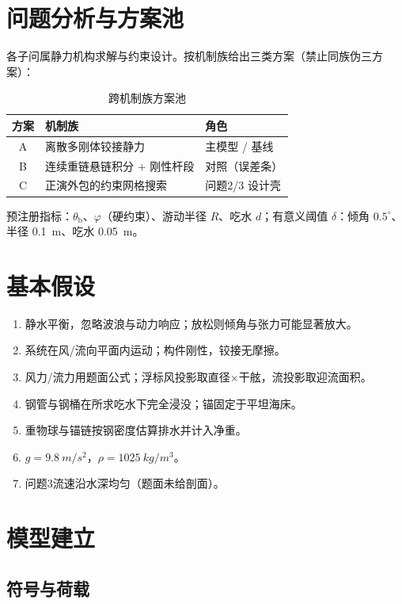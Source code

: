 \documentclass[UTF8,a4paper,12pt]{ctexart}
\begin{document}
\section{问题分析与方案池}

各子问属静力机构求解与约束设计。按机制族给出三类方案（禁止同族伪三方案）：

\begin{table}[H]
\centering
\caption{跨机制族方案池}
\label{tab:families}
\begin{tabular}{cll}
\toprule
方案 & 机制族 & 角色 \\
\midrule
A & 离散多刚体铰接静力 & 主模型 / 基线 \\
B & 连续重链悬链积分 + 刚性杆段 & 对照（误差条） \\
C & 正演外包的约束网格搜索 & 问题2/3 设计壳 \\
\bottomrule
\end{tabular}
\end{table}

预注册指标：\(\theta_{\mathrm{b}}\)、\(\varphi\)（硬约束）、游动半径 \(R\)、吃水 \(d\)；有意义阈值 \(\delta\)：倾角 \(0.5^\circ\)、半径 \SI{0.1}{m}、吃水 \SI{0.05}{m}。

\section{基本假设}

\begin{enumerate}[leftmargin=1.5em]
  \item 静水平衡，忽略波浪与动力响应；放松则倾角与张力可能显著放大。
  \item 系统在风/流向平面内运动；构件刚性，铰接无摩擦。
  \item 风力/流力用题面公式；浮标风投影取直径\(\times\)干舷，流投影取迎流面积。
  \item 钢管与钢桶在所求吃水下完全浸没；锚固定于平坦海床。
  \item 重物球与锚链按钢密度估算排水并计入净重。
  \item \(g=\SI{9.8}{m/s^2}\)，\(\rho=\SI{1025}{kg/m^3}\)。
  \item 问题3流速沿水深均匀（题面未给剖面）。
\end{enumerate}

\section{模型建立}

\subsection{符号与荷载}
\end{document}
